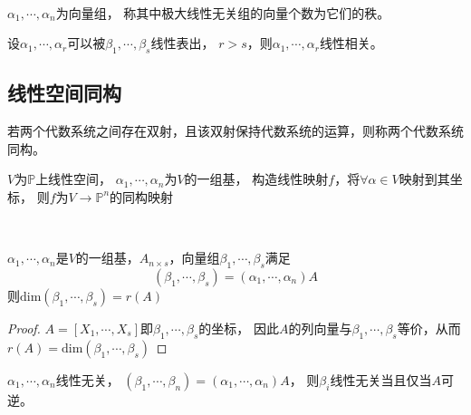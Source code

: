 ~

\begin{definition}[向量组的秩]
  $\alpha_1,\cdots,\alpha_n$为向量组，
  称其中极大线性无关组的向量个数为它们的秩。
\end{definition}

\begin{theorem}[源泉定理及其推论]
  设$\alpha_1,\cdots,\alpha_r$可以被$\beta_1,\cdots,\beta_s$线性表出，
  $r > s$，则$\alpha_1,\cdots,\alpha_r$线性相关。
\end{theorem}


\subsection{线性空间同构}

\begin{definition}[同构]
  若两个代数系统之间存在双射，且该双射保持代数系统的运算，则称两个代数系统同构。
\end{definition}

\begin{theorem}[有限维线性空间的同构映射]
  $V$为$\mathbb{P}$上线性空间，
  $\alpha_1,\cdots,\alpha_n$为$V$的一组基，
  构造线性映射$f$，将$\forall \alpha \in V$映射到其坐标，
  则$f$为$V \rightarrow \mathbb{P}^n$的同构映射
\end{theorem}

~

\begin{theorem}[用坐标研究向量组]
  $\alpha_1,\cdots,\alpha_n$是$V$的一组基，$A_{n \times s}$，向量组$\beta_1,\cdots,\beta_s$满足
  \begin{equation*}
    (\beta_1,\cdots,\beta_s) = (\alpha_1,\cdots,\alpha_n)A
  \end{equation*}
  则$\text{dim}(\beta_1,\cdots,\beta_s) = r(A)$
\end{theorem}

\begin{proof}
  $A = [X_1,\cdots,X_s]$即$\beta_1,\cdots,\beta_s$的坐标，
  因此$A$的列向量与$\beta_1,\cdots,\beta_s$等价，从而$r(A) = \mathrm{dim}(\beta_1,\cdots,\beta_s)$
\end{proof}

\begin{corollary}[线性无关情况]
  $\alpha_1,\cdots,\alpha_n$线性无关，
  $(\beta_1,\cdots,\beta_n) = (\alpha_1,\cdots,\alpha_n)A$，
  则$\beta_i$线性无关当且仅当$A$可逆。
\end{corollary}

~


